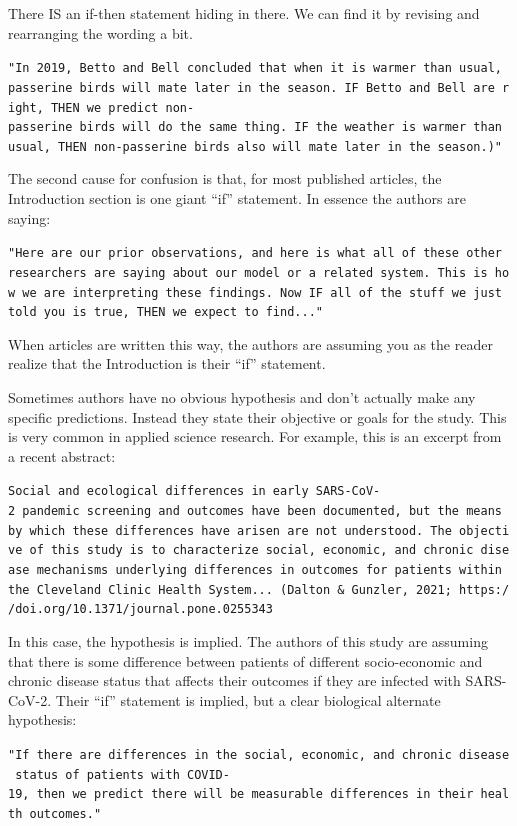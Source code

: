 \documentclass[
]{book}
\begin{document}
There IS an if-then statement hiding in there. We can find it by revising and rearranging the wording a bit.

\texttt{"In\ 2019,\ Betto\ and\ Bell\ concluded\ that\ when\ it\ is\ warmer\ than\ usual,\ passerine\ birds\ will\ mate\ later\ in\ the\ season.\ IF\ Betto\ and\ Bell\ are\ right,\ THEN\ we\ predict\ non-passerine\ birds\ will\ do\ the\ same\ thing.\ IF\ the\ weather\ is\ warmer\ than\ usual,\ THEN\ non-passerine\ birds\ also\ will\ mate\ later\ in\ the\ season.)"}

The second cause for confusion is that, for most published articles, the Introduction section is one giant ``if'' statement. In essence the authors are saying:

\texttt{"Here\ are\ our\ prior\ observations,\ and\ here\ is\ what\ all\ of\ these\ other\ researchers\ are\ saying\ about\ our\ model\ or\ a\ related\ system.\ This\ is\ how\ we\ are\ interpreting\ these\ findings.\ Now\ IF\ all\ of\ the\ stuff\ we\ just\ told\ you\ is\ true,\ THEN\ we\ expect\ to\ find..."}

When articles are written this way, the authors are assuming you as the reader realize that the Introduction is their ``if'' statement.

Sometimes authors have no obvious hypothesis and don't actually make any specific predictions. Instead they state their objective or goals for the study. This is very common in applied science research. For example, this is an excerpt from a recent abstract:

\texttt{Social\ and\ ecological\ differences\ in\ early\ SARS-CoV-2\ pandemic\ screening\ and\ outcomes\ have\ been\ documented,\ but\ the\ means\ by\ which\ these\ differences\ have\ arisen\ are\ not\ understood.\ The\ objective\ of\ this\ study\ is\ to\ characterize\ social,\ economic,\ and\ chronic\ disease\ mechanisms\ underlying\ differences\ in\ outcomes\ for\ patients\ within\ the\ Cleveland\ Clinic\ Health\ System...\ (Dalton\ \&\ Gunzler,\ 2021;\ https://doi.org/10.1371/journal.pone.0255343}

In this case, the hypothesis is implied. The authors of this study are assuming that there is some difference between patients of different socio-economic and chronic disease status that affects their outcomes if they are infected with SARS-CoV-2. Their ``if'' statement is implied, but a clear biological alternate hypothesis:

\texttt{"If\ there\ are\ differences\ in\ the\ social,\ economic,\ and\ chronic\ disease\ status\ of\ patients\ with\ COVID-19,\ then\ we\ predict\ there\ will\ be\ measurable\ differences\ in\ their\ health\ outcomes."}
\end{document}
